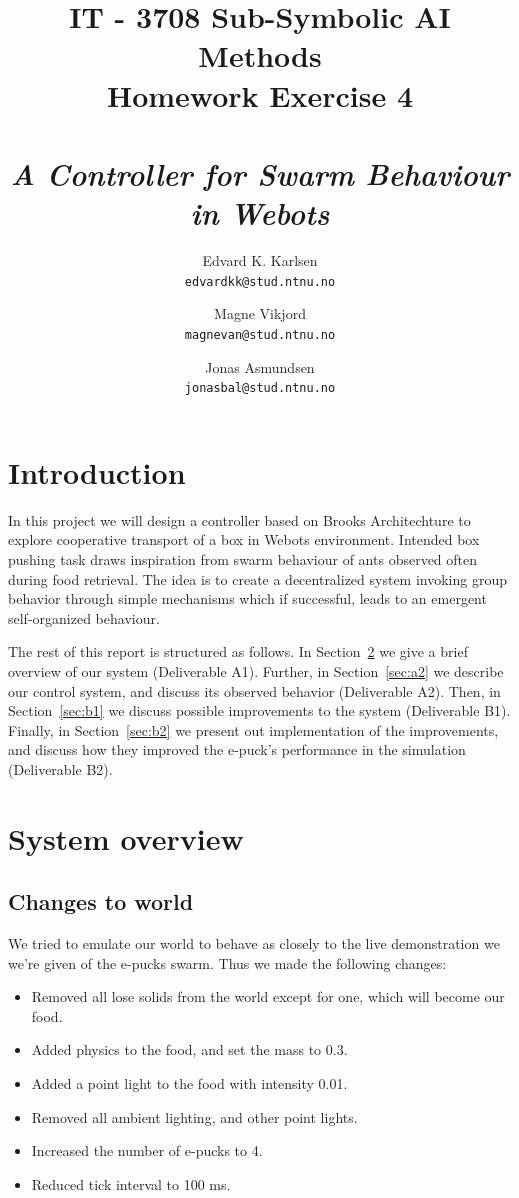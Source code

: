 \documentclass[a4paper,10pt]{article}
\title{
    IT - 3708 Sub-Symbolic AI Methods \\
    Homework Exercise 4\\
    ~\\
    \emph{A Controller for Swarm Behaviour in Webots}
}
\author{
    Edvard K. Karlsen \\
    \texttt{edvardkk@stud.ntnu.no}
    \and
    Magne Vikjord \\
    \texttt{magnevan@stud.ntnu.no}
    \and
    Jonas Asmundsen \\
    \texttt{jonasbal@stud.ntnu.no}
}
\date {}
\newcommand{\numbots}{4}
\newcommand{\foodmass}{0.3}
\newcommand{\lightintensity}{0.01}
\newcommand{\tickinterval}{100 ms}
\begin{document}
\maketitle

\section{Introduction}
In this project we will design a controller based on Brooks Architechture to
explore cooperative transport of a box in Webots environment. Intended box
pushing task draws inspiration from swarm behaviour of ants observed often
during food retrieval. The idea is to create a decentralized system invoking
group behavior through simple mechanisms which if successful, leads to an
emergent self-organized behaviour.

The rest of this report is structured as follows. In Section~\ref{sec:a1} we
give a brief overview of our system (Deliverable A1).  Further, in
Section~\ref{sec:a2} we describe our control system, and discuss its observed
behavior (Deliverable A2). Then, in Section~\ref{sec:b1} we discuss possible
improvements to the system (Deliverable B1). Finally, in Section~\ref{sec:b2}
we present out implementation of the improvements, and discuss how they
improved the e-puck's performance in the simulation (Deliverable B2).

\section{System overview}
\label{sec:a1}

\subsection{Changes to world}
We tried to emulate our world to behave as closely to the live demonstration
we we're given of the e-pucks swarm. Thus we made the following changes:

\begin{itemize}
\item Removed all lose solids from the world except for one, which will become our food.
\item Added physics to the food, and set the mass to \foodmass.
\item Added a point light to the food with intensity \lightintensity.
\item Removed all ambient lighting, and other point lights.
\item Increased the number of e-pucks to \numbots.
\item Reduced tick interval to \tickinterval.
\end{itemize}
\end{document}
